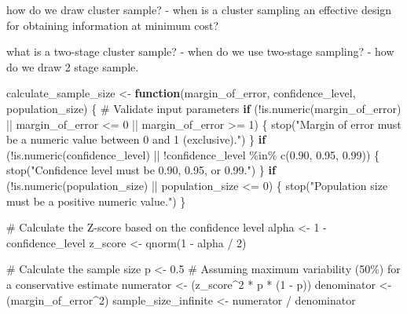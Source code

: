 \documentclass[
  letterpaper,
  DIV=11,
  numbers=noendperiod]{scrreprt}
\newenvironment{Shaded}{\begin{snugshade}}{\end{snugshade}}
\newcommand{\CommentTok}[1]{\textcolor[rgb]{0.37,0.37,0.37}{#1}}
\newcommand{\ControlFlowTok}[1]{\textcolor[rgb]{0.00,0.23,0.31}{\textbf{#1}}}
\newcommand{\DecValTok}[1]{\textcolor[rgb]{0.68,0.00,0.00}{#1}}
\newcommand{\FloatTok}[1]{\textcolor[rgb]{0.68,0.00,0.00}{#1}}
\newcommand{\FunctionTok}[1]{\textcolor[rgb]{0.28,0.35,0.67}{#1}}
\newcommand{\NormalTok}[1]{\textcolor[rgb]{0.00,0.23,0.31}{#1}}
\newcommand{\OtherTok}[1]{\textcolor[rgb]{0.00,0.23,0.31}{#1}}
\newcommand{\SpecialCharTok}[1]{\textcolor[rgb]{0.37,0.37,0.37}{#1}}
\newcommand{\StringTok}[1]{\textcolor[rgb]{0.13,0.47,0.30}{#1}}
\begin{document}
how do we draw cluster sample? - when is a cluster sampling an effective
design for obtaining information at minimum cost?

what is a two-stage cluster sample? - when do we use two-stage sampling?
- how do we draw 2 stage sample.

\begin{Shaded}
\begin{Highlighting}[]
\NormalTok{calculate\_sample\_size }\OtherTok{\textless{}{-}} \ControlFlowTok{function}\NormalTok{(margin\_of\_error, confidence\_level, population\_size) \{}
  \CommentTok{\# Validate input parameters}
  \ControlFlowTok{if}\NormalTok{ (}\SpecialCharTok{!}\FunctionTok{is.numeric}\NormalTok{(margin\_of\_error) }\SpecialCharTok{||}\NormalTok{ margin\_of\_error }\SpecialCharTok{\textless{}=} \DecValTok{0} \SpecialCharTok{||}\NormalTok{ margin\_of\_error }\SpecialCharTok{\textgreater{}=} \DecValTok{1}\NormalTok{) \{}
    \FunctionTok{stop}\NormalTok{(}\StringTok{"Margin of error must be a numeric value between 0 and 1 (exclusive)."}\NormalTok{)}
\NormalTok{  \}}
  \ControlFlowTok{if}\NormalTok{ (}\SpecialCharTok{!}\FunctionTok{is.numeric}\NormalTok{(confidence\_level) }\SpecialCharTok{||} \SpecialCharTok{!}\NormalTok{confidence\_level }\SpecialCharTok{\%in\%} \FunctionTok{c}\NormalTok{(}\FloatTok{0.90}\NormalTok{, }\FloatTok{0.95}\NormalTok{, }\FloatTok{0.99}\NormalTok{)) \{}
    \FunctionTok{stop}\NormalTok{(}\StringTok{"Confidence level must be 0.90, 0.95, or 0.99."}\NormalTok{)}
\NormalTok{  \}}
  \ControlFlowTok{if}\NormalTok{ (}\SpecialCharTok{!}\FunctionTok{is.numeric}\NormalTok{(population\_size) }\SpecialCharTok{||}\NormalTok{ population\_size }\SpecialCharTok{\textless{}=} \DecValTok{0}\NormalTok{) \{}
    \FunctionTok{stop}\NormalTok{(}\StringTok{"Population size must be a positive numeric value."}\NormalTok{)}
\NormalTok{  \}}

  \CommentTok{\# Calculate the Z{-}score based on the confidence level}
\NormalTok{  alpha }\OtherTok{\textless{}{-}} \DecValTok{1} \SpecialCharTok{{-}}\NormalTok{ confidence\_level}
\NormalTok{  z\_score }\OtherTok{\textless{}{-}} \FunctionTok{qnorm}\NormalTok{(}\DecValTok{1} \SpecialCharTok{{-}}\NormalTok{ alpha }\SpecialCharTok{/} \DecValTok{2}\NormalTok{)}

  \CommentTok{\# Calculate the sample size}
\NormalTok{  p }\OtherTok{\textless{}{-}} \FloatTok{0.5} \CommentTok{\# Assuming maximum variability (50\%) for a conservative estimate}
\NormalTok{  numerator }\OtherTok{\textless{}{-}}\NormalTok{ (z\_score}\SpecialCharTok{\^{}}\DecValTok{2} \SpecialCharTok{*}\NormalTok{ p }\SpecialCharTok{*}\NormalTok{ (}\DecValTok{1} \SpecialCharTok{{-}}\NormalTok{ p))}
\NormalTok{  denominator }\OtherTok{\textless{}{-}}\NormalTok{ (margin\_of\_error}\SpecialCharTok{\^{}}\DecValTok{2}\NormalTok{)}
\NormalTok{  sample\_size\_infinite }\OtherTok{\textless{}{-}}\NormalTok{ numerator }\SpecialCharTok{/}\NormalTok{ denominator}


\end{Highlighting}
\end{Shaded}
\end{document}
